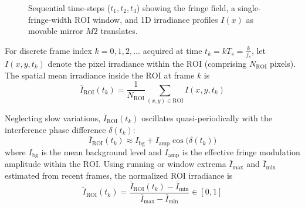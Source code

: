 \begin{figure}[htbp]
    \caption{Sequential time-steps ($t_1, t_2, t_3$) showing the fringe field, a single-fringe-width $\text{ROI}$ window, and 1D irradiance profiles $I(x)$ as movable mirror $M2$ translates.}
    \label{fig:three_step_fringes}
\end{figure}


For discrete frame index $k = 0, 1, 2, \dots$ acquired at time $t_k = k T_s = \frac{k}{f_s}$, let $I(x, y, t_k)$ denote the pixel irradiance within the $\text{ROI}$ (comprising $N_{\text{ROI}}$ pixels). The spatial mean irradiance inside the $\text{ROI}$ at frame $k$ is
\begin{equation}
    \bar{I}_{\text{ROI}}(t_k) = \frac{1}{N_{\text{ROI}}} \sum_{(x, y) \in \text{ROI}} I(x, y, t_k)
    \label{eq:roi_mean_irradiance}
\end{equation}

Neglecting slow variations, $\bar{I}_{\text{ROI}}(t_k)$ oscillates quasi-periodically with the interference phase difference $\delta(t_k)$:
\begin{equation}
    \bar{I}_{\text{ROI}}(t_k) \approx I_{\text{bg}} + I_{\text{amp}} \cos\!\bigl(\delta(t_k)\bigr)
    \label{eq:roi_irradiance_model}
\end{equation}
where $I_{\text{bg}}$ is the mean background level and $I_{\text{amp}}$ is the effective fringe modulation amplitude within the $\text{ROI}$. Using running or window extrema $\bar{I}_{\max}$ and $\bar{I}_{\min}$ estimated from recent frames, the normalized ROI irradiance is
\begin{equation}
    \tilde{I}_{\text{ROI}}(t_k) = \frac{\bar{I}_{\text{ROI}}(t_k) - \bar{I}_{\min}}{\bar{I}_{\max} - \bar{I}_{\min}} \in [0, 1]
    \label{eq:normalized_roi_irradiance}
\end{equation}

